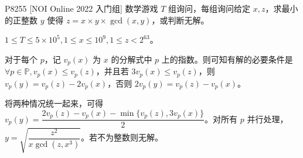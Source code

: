 \documentclass[../main.tex]{subfiles}
\begin{document}
\subsubsection{}

\begin{frame}{P8255 [NOI Online 2022 入门组] 数学游戏}
$T$ 组询问，每组询问给定 $x,z$，求最小的正整数 $y$ 使得 $z=x\times y\times \gcd(x,y)$，或判断无解。

$1\le T\le 5\times10^5,1\le x\le 10^9,1\le z<2^{63}$。
\end{frame}

\begin{frame}
对于每个 $p$，记 $v_p(x)$ 为 $x$ 的分解式中 $p$ 上的指数。则可知有解的必要条件是 $\forall p\in \mathbb{P},v_p(x)\le v_p(z)$，并且若 $3v_p(x)\le v_p(z)$，则 $v_p(y)=v_p(z)-2v_p(x)$，否则 $2v_p(y)=v_p(z)-v_p(x)$。 \pause

将两种情况统一起来，可得 $v_p(y)=\dfrac{2v_p(z)-v_p(x)-\min\{v_p(z),3v_p(x)\}}{2}$。对所有 $p$ 并行处理，$y=\sqrt{\dfrac{z^2}{x\gcd(z,x^3)}}$。若不为整数则无解。
\end{frame}
\end{document}

